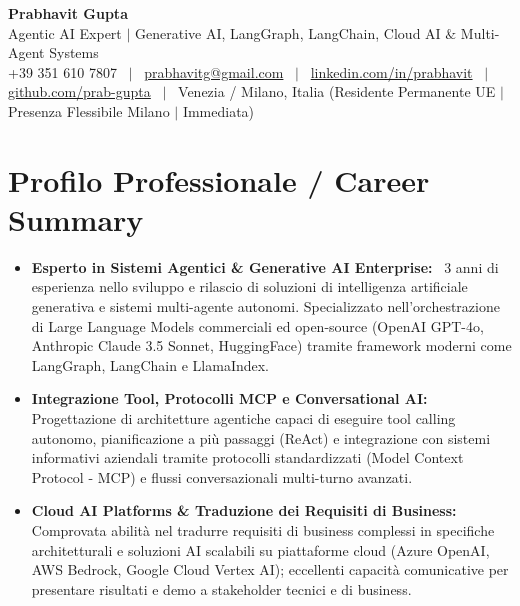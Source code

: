 \documentclass[a4paper,10pt]{article}
\begin{document}
\begin{minipage}[c]{0.80\textwidth}
  {\Huge\bfseries Prabhavit Gupta}\\[3pt]
  {\color{accent}\large Agentic AI Expert $\vert$ Generative AI, LangGraph, LangChain, Cloud AI $\&$ Multi-Agent Systems}\\[6pt]
  {\footnotesize +39 351 610 7807 ~$\vert$~
  \href{mailto:prabhavitg@gmail.com}{prabhavitg@gmail.com} ~$\vert$~
  \href{https://www.linkedin.com/in/prabhavit/}{linkedin.com/in/prabhavit} ~$\vert$~
  \href{https://github.com/prab-gupta}{github.com/prab-gupta} ~$\vert$~
  Venezia / Milano, Italia (Residente Permanente UE $\vert$ Presenza Flessibile Milano $\vert$ Immediata)}
\end{minipage}\hfill

\vspace{6pt}

\section{Profilo Professionale / Career Summary}
\begin{itemize}
  \item \textbf{Esperto in Sistemi Agentici \& Generative AI Enterprise:} ~3 anni di esperienza nello sviluppo e rilascio di soluzioni di intelligenza artificiale generativa e sistemi multi-agente autonomi. Specializzato nell'orchestrazione di Large Language Models commerciali ed open-source (OpenAI GPT-4o, Anthropic Claude 3.5 Sonnet, HuggingFace) tramite framework moderni come LangGraph, LangChain e LlamaIndex.
  \item \textbf{Integrazione Tool, Protocolli MCP e Conversational AI:} Progettazione di architetture agentiche capaci di eseguire tool calling autonomo, pianificazione a più passaggi (ReAct) e integrazione con sistemi informativi aziendali tramite protocolli standardizzati (Model Context Protocol - MCP) e flussi conversazionali multi-turno avanzati.
  \item \textbf{Cloud AI Platforms \& Traduzione dei Requisiti di Business:} Comprovata abilità nel tradurre requisiti di business complessi in specifiche architetturali e soluzioni AI scalabili su piattaforme cloud (Azure OpenAI, AWS Bedrock, Google Cloud Vertex AI); eccellenti capacità comunicative per presentare risultati e demo a stakeholder tecnici e di business.
\end{itemize}
\end{document}
